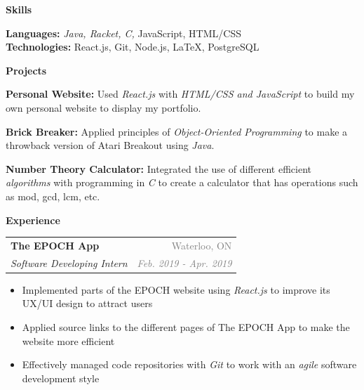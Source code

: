 \documentclass[letterpaper,11pt]{article}
\makeatletter
\newcommand{\resheading}[1]{{\large \colorbox{LightMidnightBlue}{\begin{minipage}{\textwidth}{\textbf{\textrm{#1 \vphantom{p\^{E}}}}}\end{minipage}}}}
\newcommand{\ressubheading}[4]{
\begin{tabular*}{7in}{l@{\extracolsep{\fill}}r}
        \textbf{#1} & \textcolor{gray}{#2} \\
        \textit{#3} & \textcolor{gray}{\textit{#4}} \\
\end{tabular*}\vspace{-6pt}}
\makeatother
\begin{document}
\sffamily

\hline

\vspace{2.5mm}

\resheading{Skills}

\vspace{2mm}

\textbf{Languages:} \textit{Java, Racket, C,} JavaScript, HTML/CSS \\
\vspace{1.75mm}
\textbf{Technologies:} React.js, Git, Node.js, \LaTeX, PostgreSQL

\vspace{2mm}

\resheading{Projects}

\vspace{2mm}

\textbf{Personal Website:} Used \textit{React.js} with \textit{HTML/CSS and JavaScript} to build my own personal website to display my portfolio. \\

\vspace{1.5mm}

\textbf{Brick Breaker:} Applied principles of \textit{Object-Oriented Programming} to make a throwback version of Atari Breakout using \textit{Java}.

\vspace{1.5mm}

\textbf{Number Theory Calculator:} Integrated the use of different efficient \textit{algorithms} with programming in \textit{C} to create a calculator that has operations such as mod, gcd, lcm, etc.

\vspace{2mm}

\resheading{Experience}

\vspace{2mm}

    \ressubheading{The EPOCH App}{Waterloo, ON}{Software Developing Intern}{Feb. 2019 - Apr. 2019}
        \begin{itemize}
            \item Implemented parts of the EPOCH website using \textit{React.js} to improve its UX/UI design to attract users
            \item Applied source links to the different pages of The EPOCH App to make the website more efficient
            \item Effectively managed code repositories with \textit{Git} to work with an \textit{agile} software development style
        \end{itemize}
\end{document}
